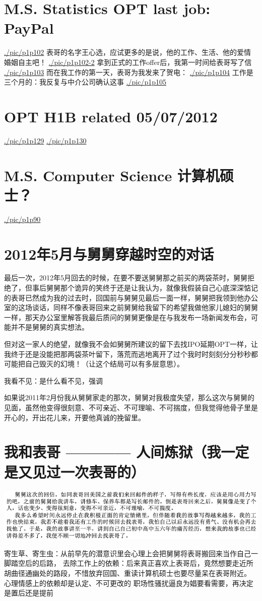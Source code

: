 \documentclass[9pt, b5paper]{article}
\begin{document}
\section{M.S. Statistics OPT last job: PayPal}
\label{sec:org72505a0}
\url{./pic/p1p102}
表哥的名字王心选，应试更多的是说，他的工作、生活、他的爱情婚姻自主吧！
\url{./pic/p1p102-2}
拿到正式的工作offer后，我第一时间给表哥写了信
\url{./pic/p1p103}
而在我工作的第一天，表哥为我发来了贺电：
\url{./pic/p1p104}
工作是三个月的：我反复与中介公司确认这事
\url{./pic/p1p105}

\section{OPT H1B related 05/07/2012}
\label{sec:orgf78ec5d}
\url{./pic/p1p129}
\url{./pic/p1p130}
\section{M.S. Computer Science 计算机硕士？}
\label{sec:org9ed0310}
\url{./pic/p1p90}


\section{2012年5月与舅舅穿越时空的对话}
\label{sec:org24cb68e}
最后一次，2012年5月回去的时候，在要不要送舅舅那之前买的两袋茶时，舅舅拒绝了，但事后舅舅那个诡异的笑终于还是让我认为，就像我假装自己心底深深惦记的表哥已然成为我的过去时，回国前与舅舅见最后一面一样，舅舅把我领到他办公室的这场谈话，同样不像表哥回来之前舅舅给我留下的希望我做他家儿媳妇的舅舅一样，那天办公室里解答我最后质问的舅舅更像是在与我发布一场新闻发布会，可能并不是舅舅的真实想法。

但对这一家人的绝望，就像我不会如舅舅所建议的留下去找IPO延期OPT一样，让我终于还是没能把那两袋茶叶留下，落荒而逃地离开了过个我时时刻刻分分秒秒都可能把自己毁灭的幻境！（让这个结局可以有多层意思）。

我看不见：是什么看不见，强调

如果说2011年2月份我从舅舅家走的那次，舅舅对我极度失望，那么这次与舅舅的见面，虽然他变得很刻意、不可亲近、不可理喻、不可揣度，但我觉得他骨子里是开心的，开出花儿来，开要他真诚的挽留里。

\section{我和表哥 ———— 人间炼狱（我一定是又见过一次表哥的）}
\label{sec:orgcdaa822}
\begin{center}
\includegraphics[width=.9\linewidth]{./pic/p1p130-2.png}
\end{center}
寄生草、寄生虫：从前早先的潜意识里会心理上会把舅舅将表哥搬回来当作自己一脚踏空后的后路，
去除工作上的依赖：后来真正喜欢上表哥后，竟然想要走近所胡曲径通幽处的路段，不惜放弃回国、重读计算机硕士也要尽量呆在表哥附近。 
心理情感上的依赖却是认定、不可更改的
职场性骚扰逼良为娼要看需要，再决定是置后还是提前
\end{document}
